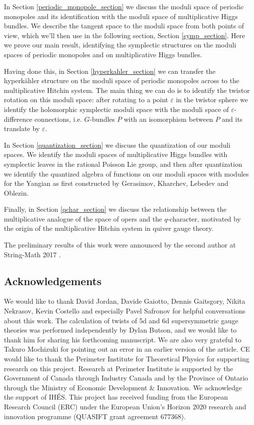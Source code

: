 \documentclass[11pt, oneside, reqno]{amsart}
\theoremstyle{definition} \newtheorem{definition}{Definition}[section]
\theoremstyle{definition} \newtheorem{remark}[definition]{Remark}
\theoremstyle{definition} \newtheorem{remarks}[definition]{Remarks}
\theoremstyle{definition} \newtheorem{question}[definition]{Question}
\theoremstyle{definition} \newtheorem*{note}{Note}
\theoremstyle{definition} \newtheorem{example}[definition]{Example}
\theoremstyle{definition} \newtheorem{examples}[definition]{Examples}
\newcommand{\eps}{\varepsilon}
\begin{document}
In Section \ref{periodic_monopole_section} we discuss the moduli space of periodic monopoles and its identification with the moduli space of multiplicative Higgs bundles.  We describe the tangent space to the moduli space from both points of view, which we'll then use in the following section, Section \ref{symp_section}.  Here we prove our main result, identifying the symplectic structures on the moduli spaces of periodic monopoles and on multiplicative Higgs bundles.

Having done this, in Section \ref{hyperkahler_section} we can transfer the hyperk\"ahler structure on the moduli space of periodic monopoles across to the multiplicative Hitchin system.  The main thing we can do is to identify the twistor rotation on this moduli space: after rotating to a point $\eps$ in the twistor sphere we identify the holomorphic symplectic moduli space with the moduli space of $\eps$-difference connections, i.e. $G$-bundles $P$ with an isomorphism between $P$ and its translate by $\eps$.

In Section \ref{quantization_section} we discuss the quantization of our moduli spaces.  We identify the moduli spaces of multiplicative Higgs bundles with symplectic leaves in the rational Poisson Lie group, and then after quantization we identify the quantized algebra of functions on our moduli spaces with modules for the Yangian as first constructed by Gerasimov, Kharchev, Lebedev and Oblezin. 

Finally, in Section \ref{qchar_section} we discuss the relationship between the multiplicative analogue of the space of opers and the $q$-character, motivated by the origin of the multiplicative Hitchin system in quiver gauge theory.

The preliminary results of this work were announced by the second author at String-Math 2017 \cite{PestunStringMath}.

\subsection{Acknowledgements}
We would like to thank David Jordan, Davide Gaiotto, Dennis Gaitsgory, Nikita Nekrasov, Kevin Costello and especially Pavel Safronov for helpful conversations about this work. The calculation of twists of 5d and 6d supersymmetric gauge theories was performed independently by Dylan Butson, and we would like to thank him for sharing his forthcoming manuscript.  We are also very grateful to Takuro Mochizuki for pointing out an error in an earlier version of the article. CE would like to thank the Perimeter Institute for Theoretical Physics for supporting research on this project. Research at Perimeter Institute is supported by the Government of Canada through Industry Canada and by the Province of Ontario through the Ministry of Economic Development \& Innovation. We acknowledge the support of IH\'ES.  This project has received funding from the European Research Council (ERC) under the European Union's Horizon 2020 research and innovation programme (QUASIFT grant agreement 677368).
\end{document}
